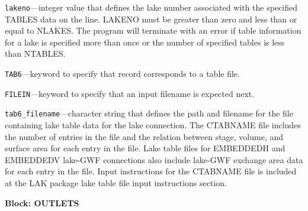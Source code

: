 \begin{description}
\item \texttt{lakeno}---integer value that defines the lake number associated with the specified TABLES data on the line. LAKENO must be greater than zero and less than or equal to NLAKES. The program will terminate with an error if table information for a lake is specified more than once or the number of specified tables is less than NTABLES.

\item \texttt{TAB6}---keyword to specify that record corresponds to a table file.

\item \texttt{FILEIN}---keyword to specify that an input filename is expected next.

\item \texttt{tab6\_filename}---character string that defines the path and filename for the file containing lake table data for the lake connection. The CTABNAME file includes the number of entries in the file and the relation between stage, volume, and surface area for each entry in the file. Lake table files for EMBEDDEDH and EMBEDDEDV lake-GWF connections also include lake-GWF exchange area data for each entry in the file. Input instructions for the CTABNAME file is included at the LAK package lake table file input instructions section.

\end{description}
\item \textbf{Block: OUTLETS}

